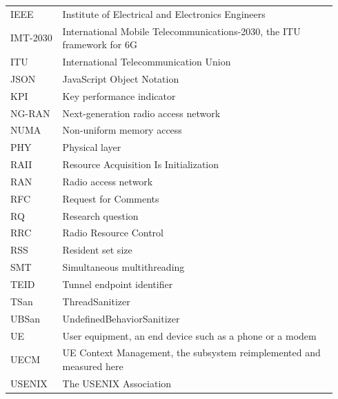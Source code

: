 \documentclass[english,oneside,a4paper,censored,csm,software-track-2020]{HYthesisML}
\begin{document}
\begin{longtable}{@{}p{0.15\linewidth} p{0.79\linewidth}@{}}
IEEE & Institute of Electrical and Electronics Engineers \\
IMT-2030 & International Mobile Telecommunications-2030, the ITU framework for 6G \\
ITU & International Telecommunication Union \\
JSON & JavaScript Object Notation \\
KPI & Key performance indicator \\
NG-RAN & Next-generation radio access network \\
NUMA & Non-uniform memory access \\
PHY & Physical layer \\
RAII & Resource Acquisition Is Initialization \\
RAN & Radio access network \\
RFC & Request for Comments \\
RQ & Research question \\
RRC & Radio Resource Control \\
RSS & Resident set size \\
SMT & Simultaneous multithreading \\
TEID & Tunnel endpoint identifier \\
TSan & ThreadSanitizer \\
UBSan & UndefinedBehaviorSanitizer \\
UE & User equipment, an end device such as a phone or a modem \\
UECM & UE Context Management, the subsystem reimplemented and measured here \\
USENIX & The USENIX Association \\
\hline
\end{longtable}
\endgroup

\cleardoublepage

\mainmatter

\singlespacing
\end{document}
